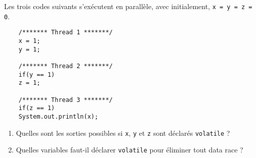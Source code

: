 
\begingroup

\begin{exercice}[Volatilité]
  \label{exo:memory/volatile}

  Les trois codes suivants s'exécutent en parallèle, avec initialement, \lstinline{x = y = z = 0}.

  \begin{lstlisting}
    /******* Thread 1 *******/
    x = 1;
    y = 1;
    
    /******* Thread 2 *******/
    if(y == 1)
    z = 1;

    /******* Thread 3 *******/
    if(z == 1)
    System.out.println(x);
  \end{lstlisting}

  \begin{enumerate}
  \item Quelles sont les sorties possibles si \lstinline{x}, \lstinline{y} et \lstinline{z} sont déclarés \lstinline{volatile} ?
  \item Quelles variables faut-il déclarer \lstinline{volatile} pour éliminer tout data race ?
  \end{enumerate}

\end{exercice}

\endgroup
\endinput
